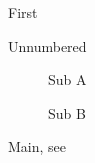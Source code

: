 \documentclass{article}
\begin{document}
\makeatletter
{}
\makeatother
\listoffigures
\begin{figure}[h]
  \caption{First}
\end{figure}
\begin{figure}[h]
  \caption*{Unnumbered}
\end{figure}
\begin{figure}[h]
  \begin{subfigure}{.4\linewidth}\caption{Sub A}\label{a}\end{subfigure}
  \begin{subfigure}{.4\linewidth}\caption{Sub B}\end{subfigure}
  \caption{Main, see }
\end{figure}
\end{document}
